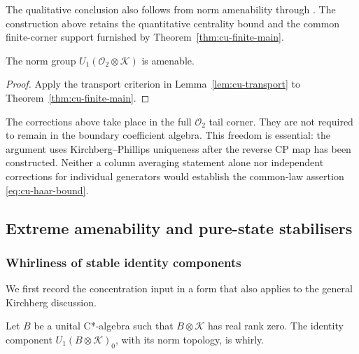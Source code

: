 \begin{remark}\label{rem:cu-remark-1}
The qualitative conclusion also follows from norm amenability through \cite[Theorem 2.4]{AlekseevSchmidtThom2025}. The construction above retains the quantitative
centrality bound and the common finite-corner support furnished by Theorem~\ref{thm:cu-finite-main}.
\end{remark}

\begin{corollary}\label{cor:cu-w-amenable}
 The norm group $U_1(\mathcal{O}_2\otimes\mathcal{K})$
is amenable.
\end{corollary}

\begin{proof}
Apply the transport criterion in Lemma~\ref{lem:cu-transport} to Theorem~\ref{thm:cu-finite-main}.
\end{proof}

\begin{remark}\label{rem:cu-remark-2}
The corrections above take place in the full $\mathcal{O}_2$ tail corner.
They are not required to remain in the boundary coefficient algebra. This
freedom is essential: the argument uses Kirchberg--Phillips uniqueness after
the reverse CP map has been constructed. Neither a column averaging
statement alone nor independent corrections for individual generators would
establish the common-law assertion \eqref{eq:cu-haar-bound}.
\end{remark}


\subsection{Extreme amenability and pure-state stabilisers}

\label{sec:cu-stabilizers}


\subsubsection{Whirliness of stable identity components}

We first record the concentration input in a form that also applies to the
general Kirchberg discussion.

\begin{lemma}\label{lem:cu-stable-whirly}
 Let $B$ be a unital C*-algebra such that $B\otimes\mathcal{K}$ has real rank zero. The identity component $U_1(B\otimes \mathcal{K})_0$, with its norm topology, is whirly.
\end{lemma}

